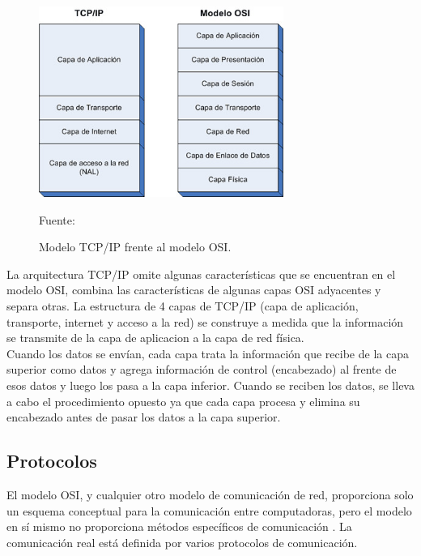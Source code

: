 \begin{figure}[H]
    \begin{center}
        \includegraphics[width=8cm]{img/capitulo_2/tcp_ip_osi.jpg}\\    
    \end{center}
    \begin{center}
        \caption{Modelo TCP/IP frente al modelo OSI.}
        Fuente: \cite{tcpiposi}
        \label{fig:tcpip}    
    \end{center}
\end{figure}

La arquitectura TCP/IP omite algunas características que se encuentran en el modelo OSI, combina las características de algunas capas OSI adyacentes y separa otras. La estructura de 4 capas de TCP/IP (capa de aplicación, transporte, internet y acceso a la red) se construye a medida que la información se transmite de la capa de aplicacion a la capa de red física.\\

Cuando los datos se envían, cada capa trata la información que recibe de la capa superior como datos y agrega información de control (encabezado) al frente de esos datos y luego los pasa a la capa inferior. Cuando se reciben los datos, se lleva a cabo el procedimiento opuesto ya que cada capa procesa y elimina su encabezado antes de pasar los datos a la capa superior.\\

\subsection{Protocolos}
El modelo OSI, y cualquier otro modelo de comunicación de red, proporciona solo un esquema conceptual para la comunicación entre computadoras, pero el modelo en sí mismo no proporciona métodos específicos de comunicación \cite{wikipedia:modeloosi}. La comunicación real está definida por varios protocolos de comunicación.\\

